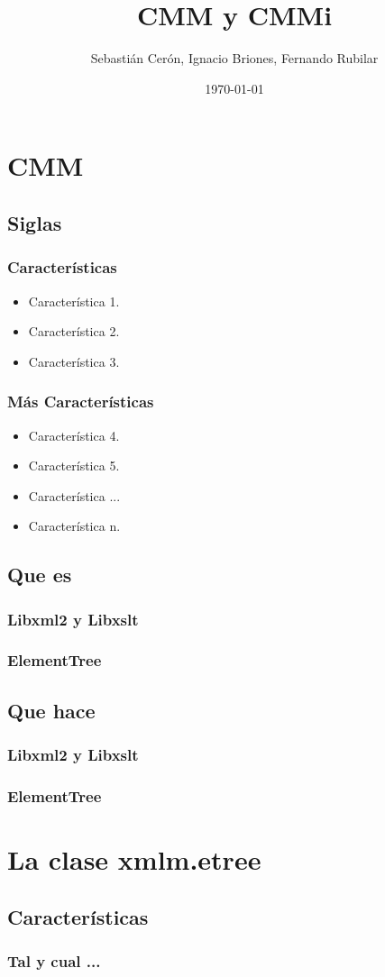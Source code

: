 \documentclass{beamer}
\title{CMM y CMMi}
\author{Sebastián Cerón, Ignacio Briones, Fernando Rubilar}
\date{\today}
\begin{document}
\frame{\titlepage}

\section[Índice]{}
\frame{\tableofcontents}
\section{CMM}
\subsection{Siglas}
\frame
{
  \frametitle{Características}
  \begin{itemize}
    \item<1-> Característica 1.
    \item<2-> Característica 2.
    \item<3-> Característica 3.
  \end{itemize}
}

\frame
{
  \frametitle{Más Características}
  \begin{itemize}
    \item Característica 4.
    \item Característica 5.
    \item Característica ...
    \item Característica n.
  \end{itemize}
}

\subsection{Que es}
\frame
{
  \frametitle{Libxml2 y Libxslt}
}

\frame
{
  \frametitle{ElementTree}
}

\subsection{Que hace}
\frame
{
  \frametitle{Libxml2 y Libxslt}
}

\frame
{
  \frametitle{ElementTree}
}

\section{La clase xmlm.etree}
\subsection{Características}
\frame
{
  \frametitle{Tal y cual ...}
}
\end{document}
